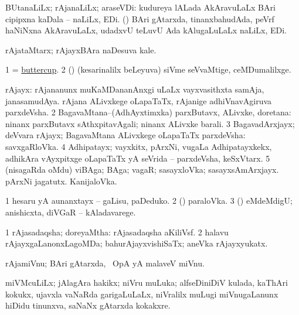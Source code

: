 \bentry
{}
\gl{\nA}
\bmng
BUtanaLiLx; rAjanaLiLx; araseVDi: 
\banum
{} kudureya lALada AkAravuLaLx BAri cipipxna kaDala -- naLiLx, EDi. 
 (\ame) BAri gAtarxda, tinanxbahudAda, peVrf haNiNxna AkAravuLaLx, udadxvU teLuvU Ada kAlugaLuLaLx naLiLx, EDi. 
\eanum
\emng
\eentry

\bentry
{}
\gl{\nA}
\bmng
rAjataMtarx; rAjayxBAra naDesuva kale. 
\emng
\eentry

\bentry
{}
\gl{\nA}
\bmng
\bnum
\num{1} = \hyperref{kandict_b.pdf}{B}{buttercup}{buttercup}. 
\num{2} (\birx) (kesarinalilx beLeyuva) siVme seVvaMtige, ceMDumalilxge. 
\enum
\emng
\eentry

\bentry
{}
\gl{\nA}
\bmng
\bnum
{} rAjayx: 
\banum
{} rAjananunx muKaMDananAnxgi uLaLx vayxvasithxta samAja, janasamudAya. 
 rAjana ALivxkege oLapaTaTx, rAjanige adhiVnavAgiruva parxdeVsha. 
\eanum
\numie
\num{2} BagavaMtana--(AdhAyxtimxka) parxButavx, ALivxke, doretana:  ninanx parxButavx sAthxpitavAgali; ninanx ALivxke barali. 
\num{3} BagavadArxjayx; deVvara rAjayx; BagavaMtana ALivxkege oLapaTaTx parxdeVsha:  savxgaRloVka. 
\num{4} Adhipatayx; vayxkitx, pArxNi, \mo vugaLa Adhipatayxkekx, adhikAra vAyxpitxge oLapaTaTx yA seVrida -- parxdeVsha, keSxVtarx. 
\num{5} (nisagaRda oMdu) viBAga; BAga; vagaR;  sasayxloVka; sasayxsAmArxjayx.  pArxNi jagatutx.  KanijaloVka. 
\enum
\emng

\noindent
\gl{\pagu}
\bmng
\bnum
\num{1}   hesaru yA aunanxtayx -- gaLisu, paDeduko. 
\num{2}  (\ashi) paraloVka. 
\num{3}  (\ashi) eMdeMdigU; anishicxta, diVGaR -- kAladavarege. 
\enum
\emng
\eentry

\bentry
{}
\gl{\gu}
\bmng
\bnum
\num{1} rAjasadaqsha; doreyaMtha:  rAjasadaqsha aKiliVsf. 
\num{2} halavu rAjayxgaLanonxLagoMDa; bahurAjayxvishiSaTx; aneVka rAjayxyukatx. 
\enum
\emng
\eentry

\bentry
{}
\gl{\nA}
\bmng
rAjamiVnu; BAri gAtarxda, \kanmu\ OpA yA malaveV  miVnu. 
\emng
\eentry

\bentry
{}
\gl{\nA}
\bmng
miVMcuLiLx; jAlagAra hakikx; niVru muLuka; alfseDiniDiV kulada, kaThAri kokukx, ujavxla vaNaRda garigaLuLaLx, niVralilx muLugi miVnugaLanunx hiDidu tinunxva, saNaNx gAtarxda kokakxre.   
\emng
\eentry

